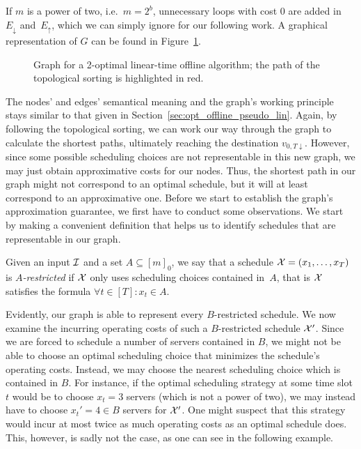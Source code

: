 If $m$ is a power of two, i.e.\ $m=2^b$, unnecessary loops with cost $0$ are added in~$E_\downarrow$ and~$E_\uparrow$, which we can simply ignore for our following work.
A graphical representation of $G$ can be found in Figure~\ref{fig:graph_lin_approx_2}.
\begin{figure}[ht]

\caption{Graph for a 2-optimal linear-time offline algorithm; the path of the topological sorting is highlighted in red.}
\label{fig:graph_lin_approx_2}
\end{figure}
The nodes' and edges' semantical meaning and the graph's working principle stays similar to that given in Section~\ref{sec:opt_offline_pseudo_lin}. Again, by following the topological sorting, we can work our way through the graph to calculate the shortest paths, ultimately reaching the destination $v_{0,T\downarrow}$. However, since some possible scheduling choices are not representable in this new graph, we may just obtain approximative costs for our nodes. Thus, the shortest path in our graph might not correspond to an optimal schedule, but it will at least correspond to an approximative one. Before we start to establish the graph's approximation guarantee, we first have to conduct some observations. We start by making a convenient definition that helps us to identify schedules that are representable in our graph.
\begin{defn}
Given an input $\mathcal{I}$ and a set $A\subseteq[m]_0$, we say that a schedule $\mathcal{X}=(x_1,\dotsc,x_T)$ is \emph{$A$-restricted} if $\mathcal{X}$ only uses scheduling choices contained in~$A$, that is $\mathcal{X}$ satisfies the formula $\forall t\in[T]:x_t\in A$.
\end{defn}
Evidently, our graph is able to represent every $B$-restricted schedule. We now examine the incurring operating costs of such a $B$-restricted schedule $\mathcal{X}'$. Since we are forced to schedule a number of servers contained in $B$, we might not be able to choose an optimal scheduling choice that minimizes the schedule's operating costs. Instead, we may choose the nearest scheduling choice which is contained in $B$. For instance, if the optimal scheduling strategy at some time slot $t$ would be to choose $x_t=3$ servers (which is not a power of two), we may instead have to choose $x_t'=4\in B$ servers for $\mathcal{X}'$. One might suspect that this strategy would incur at most twice as much operating costs as an optimal schedule does. This, however, is sadly not the case, as one can see in the following example.
